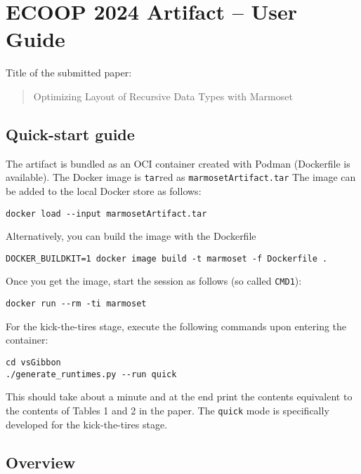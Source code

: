 \hypertarget{ecoop-2024-artifact-marmoset}{%
\section{ECOOP 2024 Artifact -- User Guide}\label{ecoop-2024-artifact-marmoset}}

Title of the submitted paper:

\begin{quote}
Optimizing Layout of Recursive Data Types with Marmoset
\end{quote}

\hypertarget{quick-start-guide}{%
\subsection{Quick-start guide}\label{quick-start-guide}}

The artifact is bundled as an OCI container created with Podman
(Dockerfile is available). The Docker image is \texttt{tar}red as
\texttt{marmosetArtifact.tar} The image can be added to the local Docker
store as follows:

\begin{verbatim}
docker load --input marmosetArtifact.tar
\end{verbatim}

Alternatively, you can build the image with the Dockerfile

\begin{verbatim}
DOCKER_BUILDKIT=1 docker image build -t marmoset -f Dockerfile .
\end{verbatim}

Once you get the image, start the session as follows (so called
\texttt{CMD1}):

\begin{verbatim}
docker run --rm -ti marmoset
\end{verbatim}

For the kick-the-tires stage, execute the following commands upon
entering the container:

\begin{verbatim}
cd vsGibbon
./generate_runtimes.py --run quick
\end{verbatim}

This should take about a minute and at the end print the contents
equivalent to the contents of Tables 1 and 2 in the paper. The
\texttt{quick} mode is specifically developed for the kick-the-tires
stage.

\hypertarget{overview}{%
\subsection{Overview}\label{overview}}


